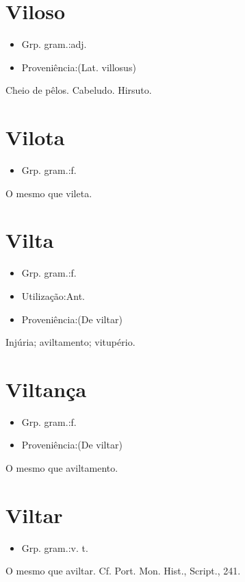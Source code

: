 \documentclass{article}
\begin{document}
\section{Viloso}
\begin{itemize}
\item {Grp. gram.:adj.}
\end{itemize}
\begin{itemize}
\item {Proveniência:(Lat. \textunderscore villosus\textunderscore )}
\end{itemize}
Cheio de pêlos.
Cabeludo.
Hirsuto.
\section{Vilota}
\begin{itemize}
\item {Grp. gram.:f.}
\end{itemize}
O mesmo que \textunderscore vileta\textunderscore .
\section{Vilta}
\begin{itemize}
\item {Grp. gram.:f.}
\end{itemize}
\begin{itemize}
\item {Utilização:Ant.}
\end{itemize}
\begin{itemize}
\item {Proveniência:(De \textunderscore viltar\textunderscore )}
\end{itemize}
Injúria; aviltamento; vitupério.
\section{Viltança}
\begin{itemize}
\item {Grp. gram.:f.}
\end{itemize}
\begin{itemize}
\item {Proveniência:(De \textunderscore viltar\textunderscore )}
\end{itemize}
O mesmo que \textunderscore aviltamento\textunderscore .
\section{Viltar}
\begin{itemize}
\item {Grp. gram.:v. t.}
\end{itemize}
O mesmo que \textunderscore aviltar\textunderscore . Cf. \textunderscore Port. Mon. Hist.\textunderscore , \textunderscore Script.\textunderscore , 241.
\end{document}

